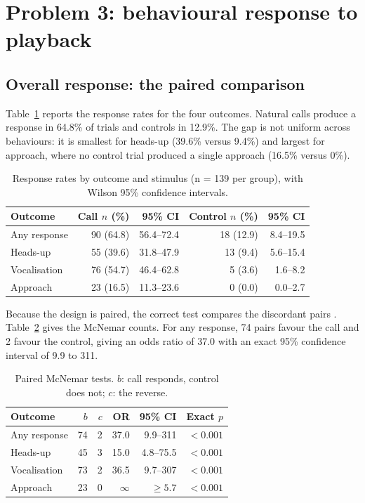 \section{Problem 3: behavioural response to playback}\label{sec:q3}

\subsection{Overall response: the paired comparison}\label{sec:q3-overall}

Table~\ref{tab:q3-rates} reports the response rates for the four outcomes. Natural calls
produce a response in 64.8\% of trials and controls in 12.9\%. The gap is not uniform across
behaviours: it is smallest for heads-up (39.6\% versus 9.4\%) and largest for approach, where
no control trial produced a single approach (16.5\% versus 0\%).

\begin{table}[htbp]
  \centering
  \caption{Response rates by outcome and stimulus (n = 139 per group), with Wilson 95\% confidence intervals.}\label{tab:q3-rates}
  \small
  \begin{tabular}{lrrrr}
    \toprule
    Outcome & Call $n$ (\%) & 95\% CI & Control $n$ (\%) & 95\% CI \\
    \midrule
    Any response & 90 (64.8) & 56.4--72.4 & 18 (12.9) & 8.4--19.5 \\
    Heads-up & 55 (39.6) & 31.8--47.9 & 13 (9.4) & 5.6--15.4 \\
    Vocalisation & 76 (54.7) & 46.4--62.8 & 5 (3.6) & 1.6--8.2 \\
    Approach & 23 (16.5) & 11.3--23.6 & 0 (0.0) & 0.0--2.7 \\
    \bottomrule
  \end{tabular}
\end{table}

Because the design is paired, the correct test compares the discordant pairs \cite{ref5}. Table~\ref{tab:q3-pair}
gives the McNemar counts. For any response, 74 pairs favour the call and 2 favour the control,
giving an odds ratio of 37.0 with an exact 95\% confidence interval of 9.9 to 311.

\begin{table}[htbp]
  \centering
  \caption{Paired McNemar tests. $b$: call responds, control does not; $c$: the reverse.}\label{tab:q3-pair}
  \small
  \begin{tabular}{lrrrrr}
    \toprule
    Outcome & $b$ & $c$ & OR & 95\% CI & Exact $p$ \\
    \midrule
    Any response & 74 & 2 & 37.0 & 9.9--311 & $<0.001$ \\
    Heads-up & 45 & 3 & 15.0 & 4.8--75.5 & $<0.001$ \\
    Vocalisation & 73 & 2 & 36.5 & 9.7--307 & $<0.001$ \\
    Approach & 23 & 0 & $\infty$ & $\geq 5.7$ & $<0.001$ \\
    \bottomrule
  \end{tabular}
\end{table}

